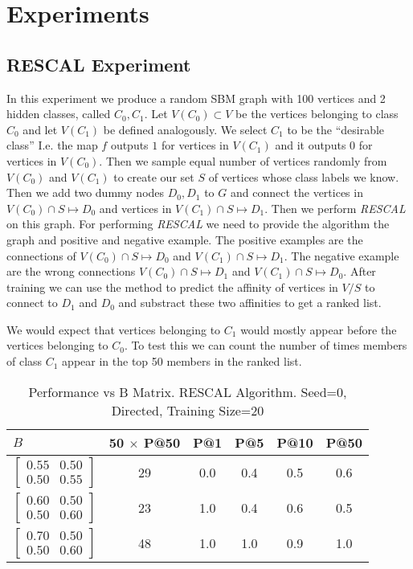 \documentclass{tufte-handout}
\begin{document}
\section{Experiments}
\label{sec:experiments}
\subsection{RESCAL Experiment}
\label{sec:simple-experiment}
In this experiment we produce a random SBM graph with 100 vertices and
2 hidden classes, called $C_0, C_1$. Let $V(C_0) \subset V$
be the vertices belonging to class $C_0$ and let $V(C_1)$ be defined
analogously. We select $C_1$ to be the ``desirable class''
I.e. the map $f$ outputs $1$ for vertices in $V(C_1)$
and it outputs $0$ for vertices in $V(C_0)$.
Then we sample equal number of vertices randomly from $V(C_0)$ and $V(C_1)$
to create our set $S$ of vertices whose class labels we know.
Then we add two dummy nodes $D_0, D_1$ to $G$ and connect
the vertices in $V(C_0) \cap S \mapsto D_0$ and
vertices in $V(C_1) \cap S \mapsto D_1$.
Then we perform \textit{RESCAL} on this graph.
For performing \textit{RESCAL} we need to provide the algorithm
the graph and positive and negative example.
The positive examples are the connections of $V(C_0) \cap S \mapsto D_0$
and $V(C_1) \cap S \mapsto D_1$. The negative example are the
wrong connections $V(C_0) \cap S \mapsto D_1$ and $V(C_1) \cap S \mapsto D_0$.
After training we can use the method to predict the affinity of vertices
in $V/S$ to connect to $D_1$ and $D_0$ and substract these two affinities
to get a ranked list.

We would expect that vertices belonging to $C_1$ would mostly appear before the
vertices belonging to $C_0$. To test this we can count the number of times
members of class $C_1$ appear in the top 50 members in the ranked list.
\pagebreak
\begin{table}[htbp]
  \begin{tabular}{l c c c c c}
    $B$ & 50 $\times$ P@50 & P@1 & P@5 & P@10 & P@50 \\ \toprule
  $\begin{bmatrix} 0.55 & 0.50 \\0.50 &0.55 \end{bmatrix}$ & 29 & 0.0 & 0.4 & 0.5 & 0.6 \\
  $\begin{bmatrix} 0.60 & 0.50 \\0.50 &0.60 \end{bmatrix}$ & 23 & 1.0 & 0.4 & 0.6 & 0.5 \\
  $\begin{bmatrix} 0.70 & 0.50 \\0.50 &0.60 \end{bmatrix}$ & 48 & 1.0 & 1.0 & 0.9 & 1.0 \\
  \end{tabular}
  \caption{Performance vs B Matrix. RESCAL Algorithm. Seed=0, Directed, Training Size=20}
  \label{tab:perf-vs-b}
\end{table}
\end{document}
